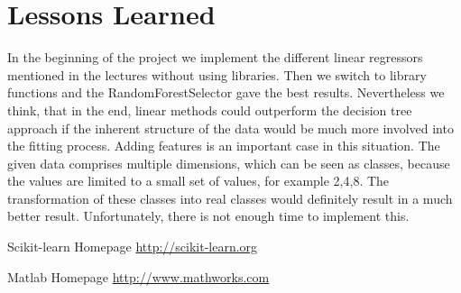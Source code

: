 \documentclass[a4paper, 11pt]{article}
\begin{document}
\section{Lessons Learned}
In the beginning of the project we implement the different linear regressors mentioned in the lectures without using libraries. Then we switch to library functions and the RandomForestSelector gave the best results. Nevertheless we think, that in the end, linear methods could outperform the decision tree approach if the inherent structure of the data would be much more involved into the fitting process. Adding features is an important case in this situation. The given data comprises multiple dimensions, which can be seen as classes, because the values are limited to a small set of values, for example 2,4,8. The transformation of these classes into real classes would definitely result in a much better result. Unfortunately, there is not enough time to implement this.

\begin{thebibliography}{1}
	
	\newblock Scikit-learn Homepage 
	\newblock
	\url{http://scikit-learn.org}
	
	\newblock Matlab Homepage
	\newblock
	\url{http://www.mathworks.com}
	
\end{thebibliography}
\end{document}

